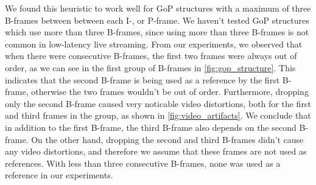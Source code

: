 We found this heuristic to work well for \ac{GoP} structures with a maximum of three B-frames between between each I-, or P-frame. We haven't tested \ac{GoP} structures which use more than three B-frames, since using more than three B-frames is not common in low-latency live streaming. From our experiments, we observed that when there were consecutive B-frames, the first two frames were always out of order, as we can see in the first group of B-frames in \autoref{fig:gop_structure}. This indicates that the second B-frame is being used as a reference by the first B-frame, otherwise the two frames wouldn't be out of order. Furthermore, dropping only the second B-frame caused very noticable video distortions, both for the first and third frames in the group, as shown in \autoref{fig:video_artifacts}. We conclude that in addition to the first B-frame, the third B-frame also depends on the second B-frame. On the other hand, dropping the second and third B-frames didn't cause any video distortions, and therefore we assume that these frames are not used as references. With less than three consecutive B-frames, none was used as a reference in our experiments.


